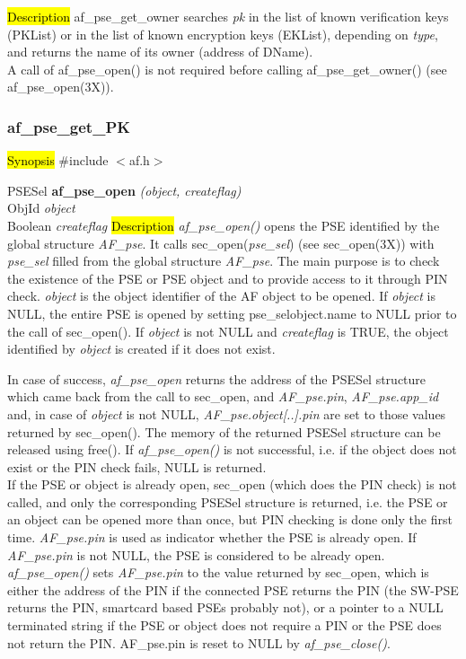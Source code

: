 
\hl{Description}
af\_pse\_get\_owner searches {\em pk} in the list of known 
verification keys (PKList) or in the list of known encryption keys (EKList), depending
on {\em type}, and returns the name of its owner (address of DName).
\\ [1em]
A call of af\_pse\_open() is not required before calling af\_pse\_get\_owner()
(see af\_pse\_open(3X)).

\subsubsection{af\_pse\_get\_PK}
\label{af_pse_open}
\hl{Synopsis}
\#include $<$af.h$>$

PSESel {\bf *af\_pse\_open} {\em (object, createflag)} \\
ObjId {\em *object} \\
Boolean {\em createflag}
\hl{Description}
{\em af\_pse\_open()} opens the PSE identified by the global structure {\em AF\_pse}.
It calls sec\_open({\em pse\_sel}) (see sec\_open(3X)) 
with {\em pse\_sel} filled from the global structure {\em AF\_pse}.
The main purpose is to check the existence of the PSE or PSE object and
to provide access to it through PIN check.
{\em object} is the object identifier of the AF object to be opened.
If {\em object} is NULL, the entire PSE is opened by setting pse\_sel\pf object.name
to NULL prior to the call of sec\_open().
If {\em object} is not NULL and {\em createflag} is TRUE, the object identified by {\em object}
is created if it does not exist.
 
In case of success, {\em af\_pse\_open} returns the address of the PSESel structure which came back from
the call to sec\_open, and {\em AF\_pse.pin}, {\em AF\_pse.app\_id} and, in case of
{\em object} is not NULL, {\em AF\_pse.object[..].pin} are set to those values returned
by sec\_open(). The memory of the returned PSESel structure can be released using free().
If {\em af\_pse\_open()} is not successful, i.e. if the object does not exist or the
PIN check fails, NULL is returned.
\\ [1em]
If the PSE or object is already open, sec\_open (which does the PIN check) is not called, 
and only the corresponding PSESel structure is returned, i.e. the PSE or an object
can be opened more than once, but PIN checking is done only the first time. 
{\em AF\_pse.pin} is used as indicator whether the PSE is already open. If {\em AF\_pse.pin} is not NULL,
the PSE is considered to be already open. {\em af\_pse\_open()} sets {\em AF\_pse.pin} to the value returned
by sec\_open, which is either the address of the PIN if the connected PSE returns the PIN (the
SW-PSE returns the PIN, smartcard based PSEs probably not), or a pointer to a NULL terminated
string if the PSE or object does not require a PIN or the PSE does not return the PIN.
AF\_pse.pin is reset to NULL by {\em af\_pse\_close()}.
 
